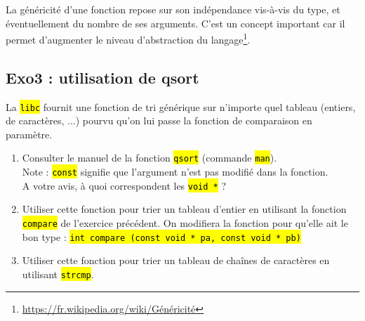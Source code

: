 \documentclass[final, pdftex, a4paper, openbib, ]{article}
\let\OldTexttt\texttt
\renewcommand{\texttt}[1]{\OldTexttt{\hl{#1}}}
\begin{document}
La généricité d'une fonction repose sur son indépendance vis-à-vis du type, et éventuellement du nombre de ses arguments.
C'est un concept important car il permet d'augmenter le niveau d'abstraction du langage\footnote{\url{https://fr.wikipedia.org/wiki/Généricité}}.

\subsection{Exo3 : utilisation de qsort}

La \texttt{libc} fournit une fonction de tri générique sur n'importe quel tableau (entiers, de caractères, ...) pourvu qu'on lui passe la fonction de comparaison en paramètre.

\begin{enumerate}
	\item Consulter le manuel de la fonction \texttt{qsort} (commande \texttt{man}).\\
	Note : \texttt{const} signifie que l'argument n'est pas modifié dans la fonction.\\
	A votre avis, à quoi correspondent les \texttt{void *} ?
	\item Utiliser cette fonction pour trier un tableau d'entier en utilisant la fonction \texttt{compare} de l'exercice précédent.
	On modifiera la fonction pour qu'elle ait le bon type :
	\texttt{int compare (const void * pa, const void * pb)}
	\item Utiliser cette fonction pour trier un tableau de chaînes de caractères en utilisant \texttt{strcmp}.
\end{enumerate}
\end{document}
